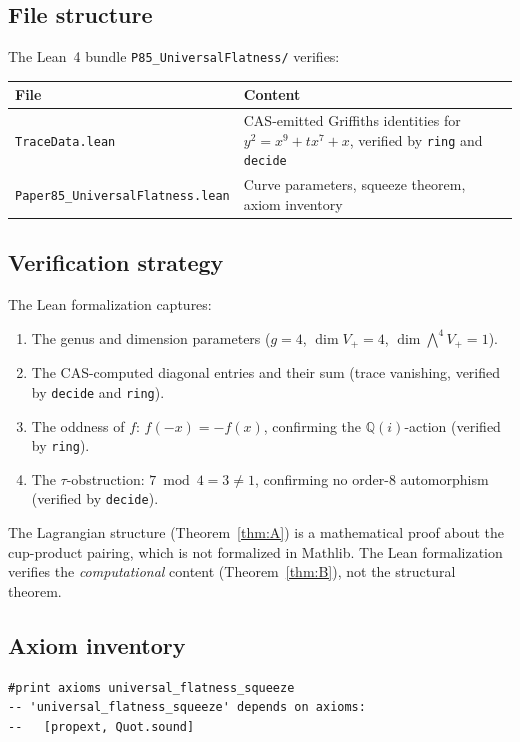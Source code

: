 \documentclass[11pt]{article}
\theoremstyle{plain}
\theoremstyle{definition}
\theoremstyle{remark}
\newcommand{\Q}{\mathbb{Q}}
\begin{document}
\subsection{File structure}

The Lean~4 bundle \texttt{P85\_UniversalFlatness/} verifies:

\begin{center}
\begin{tabular}{lp{6cm}}
\toprule
\textbf{File} & \textbf{Content} \\
\midrule
\texttt{TraceData.lean} & CAS-emitted Griffiths identities for
  $y^2 = x^9 + tx^7 + x$, verified by \texttt{ring} and
  \texttt{decide} \\
\texttt{Paper85\_UniversalFlatness.lean} & Curve parameters,
  squeeze theorem, axiom inventory \\
\bottomrule
\end{tabular}
\end{center}

\subsection{Verification strategy}

The Lean formalization captures:
\begin{enumerate}[nosep]
\item The genus and dimension parameters ($g = 4$,
  $\dim V_+ = 4$, $\dim \bigwedge^4 V_+ = 1$).
\item The CAS-computed diagonal entries and their sum
  (trace vanishing, verified by \texttt{decide} and \texttt{ring}).
\item The oddness of $f$: $f(-x) = -f(x)$, confirming the
  $\Q(i)$-action (verified by \texttt{ring}).
\item The $\tau$-obstruction: $7 \bmod 4 = 3 \ne 1$, confirming
  no order-8 automorphism (verified by \texttt{decide}).
\end{enumerate}

The Lagrangian structure (Theorem~\ref{thm:A}) is a mathematical
proof about the cup-product pairing, which is not formalized in
Mathlib.  The Lean formalization verifies the \emph{computational}
content (Theorem~\ref{thm:B}), not the structural theorem.

\subsection{Axiom inventory}

\begin{lstlisting}[style=leanstyle,caption={Expected axiom output}]
#print axioms universal_flatness_squeeze
-- 'universal_flatness_squeeze' depends on axioms:
--   [propext, Quot.sound]
\end{lstlisting}
\end{document}
